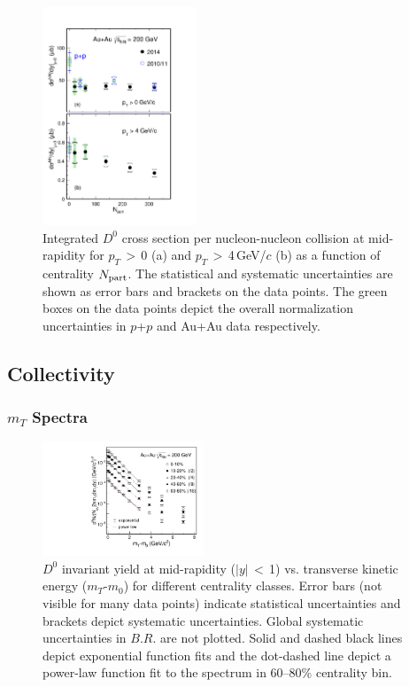 \documentclass[%
 reprint,	
 amsmath,amssymb,
 aps,
 prc,
]{revtex4-1}
\begin{document}
\begin{figure}
\centering
\includegraphics[width=0.41\textwidth]{fig/Xsection_D0.pdf}
  \caption{Integrated $D^{0}$ cross section per nucleon-nucleon collision at mid-rapidity for $p_{T}$\,$>$\,0 (a) and $p_{T}$\,$>$\,4\,GeV/$c$ (b) as a function of centrality $N_{\rm part}$. The statistical and systematic uncertainties are shown as error bars and brackets on the data points. The green boxes on the data points depict the overall normalization uncertainties in $p$+$p$ and Au+Au data respectively.}
\label{fig:Xsection_D0} 
\end{figure}

\subsection{Collectivity}
\label{result:collectivity}

\subsubsection{$m_{T}$ Spectra}
\label{result:collectivity:mT}

\begin{figure}
\centering
\includegraphics[width=0.43\textwidth]{fig/mTFit_D0.pdf}
\caption{$D^{0}$ invariant yield at mid-rapidity ($|y|$\,$<$\,1) vs. transverse kinetic energy ($m_{T}$-$m_{0}$) for different centrality classes. Error bars (not visible for many data points) indicate statistical uncertainties and brackets depict systematic uncertainties. Global systematic uncertainties in $B.R.$ are not plotted. Solid and dashed black lines depict exponential function fits and the dot-dashed line depict a power-law function fit to the spectrum in 60--80\% centrality bin.}
\label{fig:mTFit_D0} 
\end{figure}
\end{document}
